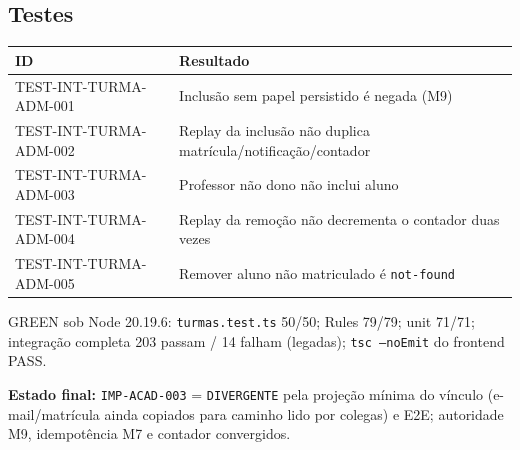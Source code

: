 \subsection{Testes}

\small
\begin{longtable}{@{}p{}p{}@{}}
\toprule
ID & Resultado \\
\midrule
\endhead
TEST-INT-TURMA-ADM-001 & Inclusão sem papel persistido é negada (M9) \\
TEST-INT-TURMA-ADM-002 & Replay da inclusão não duplica matrícula/notificação/contador \\
TEST-INT-TURMA-ADM-003 & Professor não dono não inclui aluno \\
TEST-INT-TURMA-ADM-004 & Replay da remoção não decrementa o contador duas vezes \\
TEST-INT-TURMA-ADM-005 & Remover aluno não matriculado é \texttt{not-found} \\
\bottomrule
\end{longtable}
\normalsize

GREEN sob Node 20.19.6: \texttt{turmas.test.ts} 50/50; Rules 79/79; unit 71/71;
integração completa 203 passam / 14 falham (legadas); \texttt{tsc --noEmit} do
frontend PASS.

\textbf{Estado final:} \texttt{IMP-ACAD-003} = \texttt{DIVERGENTE} pela projeção
mínima do vínculo (e-mail/matrícula ainda copiados para caminho lido por
colegas) e E2E; autoridade M9, idempotência M7 e contador convergidos.
